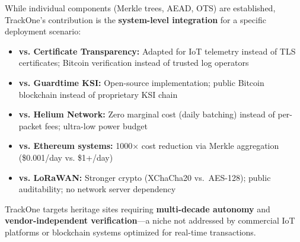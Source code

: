 While individual components (Merkle trees, \ac{AEAD}, \ac{OTS}) are established, TrackOne's contribution is the \textbf{system-level integration} for a specific deployment scenario:

\begin{itemize}[nosep]
    \item \textbf{vs. Certificate Transparency:} Adapted for \ac{IoT} telemetry instead of \ac{TLS} certificates; Bitcoin verification instead of trusted log operators
    \item \textbf{vs. Guardtime KSI:} Open-source implementation; public Bitcoin blockchain instead of proprietary KSI chain
    \item \textbf{vs. Helium Network:} Zero marginal cost (daily batching) instead of per-packet fees; ultra-low power budget
    \item \textbf{vs. Ethereum systems:} 1000× cost reduction via Merkle aggregation (\$0.001/day vs. \$1+/day)
    \item \textbf{vs. LoRaWAN:} Stronger crypto (XChaCha20 vs.\ AES-128); public auditability; no network server dependency
\end{itemize}

TrackOne targets heritage sites requiring \textbf{multi-decade autonomy} and \textbf{vendor-independent verification}—a niche not addressed by commercial \ac{IoT} platforms or blockchain systems optimized for real-time transactions.
